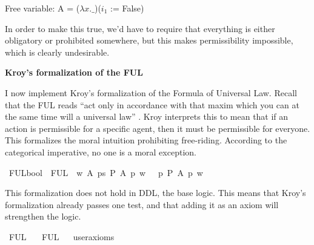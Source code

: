 \begin{isabellebody}
{  Free variable:
    A = ($\lambda x. \_$)($i_1$ := False) \color{black}%
}%
\endisatagproof
{\isafoldproof}%
%
\isadelimproof
%
\endisadelimproof
%
\begin{isamarkuptext}%
In order to make this true, we'd have to require that everything is either obligatory or
prohibited somewhere, but this makes permissibility impossible, which is clearly undesirable.%
\end{isamarkuptext}\isamarkuptrue%
%
\isadelimproof
%
\endisadelimproof
%
\isatagproof
%
\endisatagproof
{\isafoldproof}%
%
\isadelimproof
%
\endisadelimproof
%
\begin{isamarkuptext}%
\noindent \textbf{Kroy's formalization of the FUL \label{sec: kroy_ful}}%
\end{isamarkuptext}\isamarkuptrue%
%
\begin{isamarkuptext}%
I now implement Kroy's formalization of the Formula of Universal Law. Recall that the FUL reads
``act only in accordance with that maxim which you can at the same time will a universal law'' \citep[34]{groundwork}.
Kroy interprets this to mean that if an action is permissible for a specific agent, then it must be permissible for everyone.
This formalizes the moral intuition prohibiting free-riding. According to the categorical imperative, 
no one is a moral exception.%
\end{isamarkuptext}\isamarkuptrue%
\isamarkupfalse%
\ FUL{\isacharcolon}{\isacharcolon}{\isachardoublequoteopen}bool{\isachardoublequoteclose}\ \ {\isachardoublequoteopen}FUL\ {\isasymequiv}\ {\isasymforall}w\ A{\isachardot}\ {\isacharparenleft}{\isacharparenleft}{\isasymexists}p{\isacharcolon}{\isacharcolon}s{\isachardot}\ {\isacharparenleft}{\isacharparenleft}P\ {\isacharbraceleft}A\ p{\isacharbraceright}{\isacharparenright}\ w{\isacharparenright}{\isacharparenright}\ \ {\isasymlongrightarrow}{\isacharparenleft}\ {\isacharparenleft}{\isasymforall}p{\isachardot}{\isacharparenleft}\ P\ {\isacharbraceleft}A\ p{\isacharbraceright}{\isacharparenright}\ w{\isacharparenright}{\isacharparenright}{\isacharparenright}\ {\isachardoublequoteclose}\isanewline
%
%
\begin{isamarkuptext}%
This formalization does not hold in DDL, the base logic. This means that Kroy's formalization
already passes one test, and that adding it as an axiom will strengthen the logic.%
\end{isamarkuptext}\isamarkuptrue%
\isamarkupfalse%
\ FUL{\isacharcolon}\isanewline
\ \ \ FUL\isanewline
\ \ \isamarkupfalse%
{\isacharbrackleft}user{\isacharunderscore}axioms{\isacharbrackright}%
\isadelimproof
\ %
\endisadelimproof
%
\isatagproof
{}\isamarkupfalse%
\isanewline
%
\end{isabellebody}
